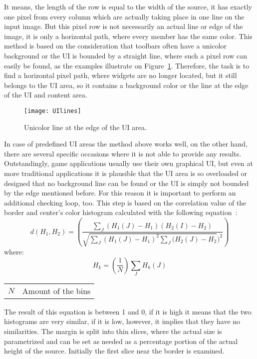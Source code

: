 \documentclass[draft,final]{vutinfth} %
\makeatletter
\newenvironment{conditions}
{\par\vspace{\abovedisplayskip}\noindent\begin{tabular}{>{$}l<{$} @{${}:{}$} l}}
	{\end{tabular}\par\vspace{\belowdisplayskip}}
\makeatother
\begin{document}
	It means, the length of the row is equal to the width of the source, it has exactly one pixel from every column which are actually taking place in one line on the input image.
	But this pixel row is not necessarily an actual line or edge of the image, it is only a horizontal path, where every member has the same color.
	This method is based on the consideration that toolbars often have a unicolor background or the UI is bounded by a straight line, where such a pixel row can easily be found, as the examples illustrate on Figure~\ref{fig:lines}.
	Therefore, the task is to find a horizontal pixel path, where widgets are no longer located, but it still belongs to the UI area, so it contains a background color or the line at the edge of the UI and content area.\par
	\begin{figure}[h]
		\centering		
		\texttt{[image: UIlines]}
		\caption{Unicolor line at the edge of the UI area.}
		\label{fig:lines}
	\end{figure}
	In case of predefined UI areas the method above works well, on the other hand, there are several specific occasions where it is not able to provide any results.
	Outstandingly, game applications usually use their own graphical UI, but even at more traditional applications it is plausible that the UI area is so overloaded or designed that no background line can be found or the UI is simply not bounded by the edge mentioned before.
	For this reason it is important to perform an additional checking loop, too.
	This step is based on the correlation value of the border and center's color histogram calculated with the following equation~\cite{compareHist}:
	\[ d(H_{1},H_{2})=\left(\frac{\sum\limits_{J}(H_{1}(J)-H_{1})(H_{2}(I)-H_{2})}{\sqrt{\sum\limits_{J}(H_{1}(J)-H_{1})^2\sum\limits_{J}(H_{2}(J)-H_{2}})^2}\right) \]
	where:
	\[H_{k}=\left(\frac{1}{N}\right)\sum\limits_{J}H_{k}(J)\]
	\begin{center}
		\begin{conditions}
			N & Amount of the bins 
		\end{conditions}
	\end{center}
	The result of this equation is between 1 and 0, if it is high it means that the two histograms are very similar, if it is low, however, it implies that they have no similarities.
	The margin is split into thin slices, where the actual size is parametrized and can be set as needed as a percentage portion of the actual height of the source.
	Initially the first slice near the border is examined.
\end{document}
